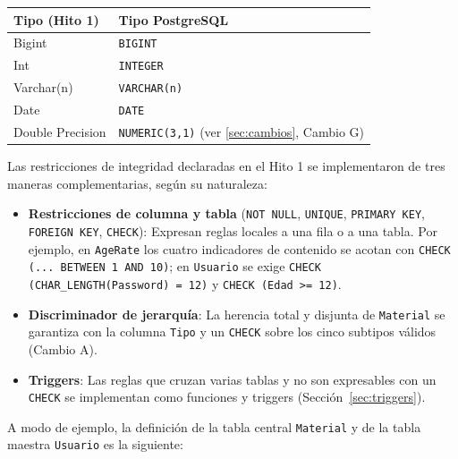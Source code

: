 \documentclass[12pt,a4paper]{article}
\begin{document}
\begin{center}
\begin{tabular}{ll}
\toprule
\textbf{Tipo (Hito 1)} & \textbf{Tipo PostgreSQL} \\
\midrule
Bigint           & \texttt{BIGINT} \\
Int              & \texttt{INTEGER} \\
Varchar(n)       & \texttt{VARCHAR(n)} \\
Date             & \texttt{DATE} \\
Double Precision & \texttt{NUMERIC(3,1)} (ver \ref{sec:cambios}, Cambio G) \\
\bottomrule
\end{tabular}
\end{center}

Las restricciones de integridad declaradas en el Hito 1 se implementaron de tres
maneras complementarias, según su naturaleza:

\begin{itemize}
  \item \textbf{Restricciones de columna y tabla} (\texttt{NOT NULL},
  \texttt{UNIQUE}, \texttt{PRIMARY KEY}, \texttt{FOREIGN KEY}, \texttt{CHECK}):
  Expresan reglas locales a una fila o a una tabla. Por ejemplo, en
  \texttt{AgeRate} los cuatro indicadores de contenido se acotan con
  \texttt{CHECK (... BETWEEN 1 AND 10)}; en \texttt{Usuario} se exige
  \texttt{CHECK (CHAR\_LENGTH(Password) = 12)} y \texttt{CHECK (Edad >= 12)}.

  \item \textbf{Discriminador de jerarquía}: La herencia total y disjunta de
  \texttt{Material} se garantiza con la columna \texttt{Tipo} y un
  \texttt{CHECK} sobre los cinco subtipos válidos (Cambio A).

  \item \textbf{Triggers}: Las reglas que cruzan varias tablas y no son
  expresables con un \texttt{CHECK} se implementan como funciones y triggers
  (Sección~\ref{sec:triggers}).
\end{itemize}

A modo de ejemplo, la definición de la tabla central \texttt{Material} y de la
tabla maestra \texttt{Usuario} es la siguiente:
\end{document}
